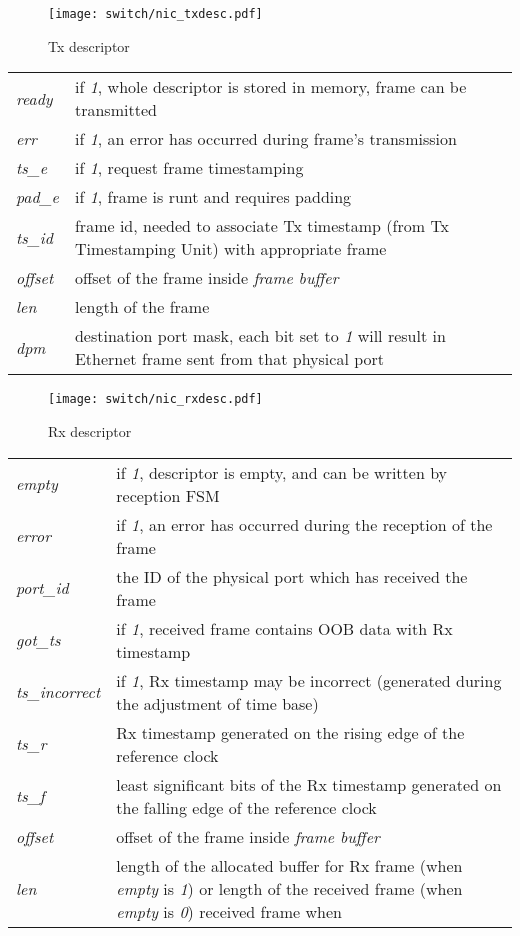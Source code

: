 \begin{figure}[ht]
  \begin{center}
    \texttt{[image: switch/nic\_txdesc.pdf]}
    \caption{Tx descriptor}
    \label{fig:nic:tx_desc}
  \end{center}
\end{figure}
\newpage
\begin{tabular}{l p{12cm}}
  \emph{ready} & if \emph{1}, whole descriptor is stored in memory, frame can be
  transmitted\\
  \emph{err} & if \emph{1}, an error has occurred during frame's
    transmission\\
  \emph{ts\_e} & if \emph{1}, request frame timestamping\\
  \emph{pad\_e} & if \emph{1}, frame is runt and requires padding\\
  \emph{ts\_id} & frame id, needed to associate Tx timestamp (from Tx
    Timestamping Unit) with appropriate frame\\
  \emph{offset} & offset of the frame inside \emph{frame buffer}\\
  \emph{len} & length of the frame\\
  \emph{dpm} & destination port mask, each bit set to \emph{1} will
    result in Ethernet frame sent from that physical port\\
\end{tabular}


\begin{figure}[ht]
  \begin{center}
    \texttt{[image: switch/nic\_rxdesc.pdf]}
    \caption{Rx descriptor}
    \label{fig:nic:rx_desc}
  \end{center}
\end{figure}
\begin{tabular}{l p{12cm}}
  \emph{empty} & if \emph{1}, descriptor is empty, and can be written by
  reception FSM\\
  \emph{error} & if \emph{1}, an error has occurred during the reception of the
  frame\\
  \emph{port\_id} & the ID of the physical port which has received the frame\\
  \emph{got\_ts} & if \emph{1}, received frame contains OOB data with Rx
  timestamp\\
  \emph{ts\_incorrect} & if \emph{1}, Rx timestamp may be incorrect (generated
  during the adjustment of time base)\\
  \emph{ts\_r} & Rx timestamp generated on the rising edge of the reference
  clock\\
  \emph{ts\_f} & least significant bits of the Rx timestamp generated on the
  falling edge of the reference clock\\
  \emph{offset} & offset of the frame inside \emph{frame buffer}\\
  \emph{len} & length of the allocated buffer for Rx frame (when \emph{empty}
  is \emph{1}) or length of the received frame (when \emph{empty} is \emph{0})
  received frame when
\end{tabular}

